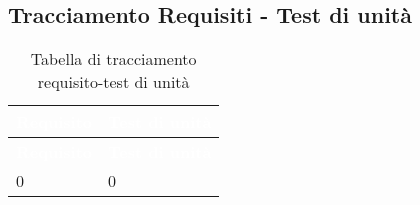 \subsection{Tracciamento Requisiti - Test di unità}
{
\renewcommand{\arraystretch}{1.5}
\centering
\begin{longtable}{C{4cm} C{4cm}}
\caption{Tabella di tracciamento requisito-test di unità}\\
\textcolor{white}{\textbf{Requisito}} & \textcolor{white}{\textbf{Test di unità}}\\	
\endfirsthead
{}
\textcolor{white}{\textbf{Requisito}} & \textcolor{white}{\textbf{Test di unità}}\\	
\endhead

0 & 0  \\

\end{longtable}
}